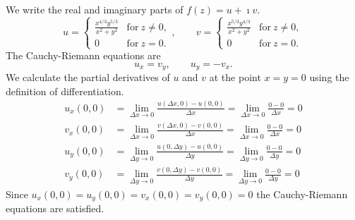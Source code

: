 {%
\begin{Solution}
  \label{solution C-R x43y53}
  We write the real and imaginary parts of $f(z) = u + \imath v$.
  \[
  u = 
  \begin{cases}
    \frac{ x^{4/3} y^{5/3} }{ x^2 + y^2 } &\mathrm{for}\ z \neq 0, 
    \\
    0       &\mathrm{for}\ z = 0.
  \end{cases}, \qquad
  v = 
  \begin{cases}
    \frac{ x^{5/3} y^{4/3} }{ x^2 + y^2 } &\mathrm{for}\ z \neq 0, 
    \\
    0       &\mathrm{for}\ z = 0.
  \end{cases}
  \]
  The Cauchy-Riemann equations are
  \[
  u_x = v_y, \qquad u_y = - v_x.
  \]
  We calculate the partial derivatives of $u$ and $v$ at the point 
  $x = y = 0$ using the definition of differentiation.
  \begin{align*}
    u_x(0,0) &= \lim_{\Delta x \to 0} \frac{u(\Delta x, 0) - u(0,0)}{\Delta x} 
    = \lim_{\Delta x \to 0} \frac{0 - 0}{\Delta x} 
    = 0
    \\
    v_x(0,0) &= \lim_{\Delta x \to 0} \frac{v(\Delta x, 0) - v(0,0)}{\Delta x} 
    = \lim_{\Delta x \to 0} \frac{0 - 0}{\Delta x} 
    = 0
    \\
    u_y(0,0) &= \lim_{\Delta y \to 0} \frac{u(0, \Delta y) - u(0,0)}{\Delta y} 
    = \lim_{\Delta y \to 0} \frac{0 - 0}{\Delta y} 
    = 0
    \\
    v_y(0,0) &= \lim_{\Delta y \to 0} \frac{v(0, \Delta y) - v(0,0)}{\Delta y} 
    = \lim_{\Delta y \to 0} \frac{0 - 0}{\Delta y} 
    = 0
  \end{align*}
  Since $u_x(0,0) = u_y(0,0) = v_x(0,0) = v_y(0,0) = 0$ the Cauchy-Riemann
  equations are satisfied.



\end{Solution}}
